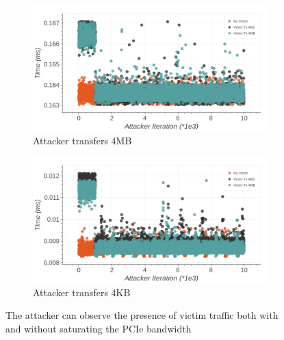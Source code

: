 \begin{figure}
     \centering
     
     \begin{subfigure}[b]{\textwidth}
         \centering
        \includegraphics[width=\textwidth]{figures/interconnect-sc/dma/dma_contention_4MB.png}
        \caption{Attacker transfers 4MB}
        \label{fig:dma-contention-4mb}
     \end{subfigure}

    \hfill
     
     \begin{subfigure}[b]{\textwidth}
        \centering
        \includegraphics[width=\textwidth]{figures/interconnect-sc/dma/dma_contention_4KB.png}
        \caption{Attacker transfers 4KB}
        \label{fig:dma-contention-4kb}
     \end{subfigure}

     \caption{The attacker can observe the presence of victim traffic both with and without saturating the PCIe bandwidth}
    \label{fig:dma-contention}
\end{figure}


